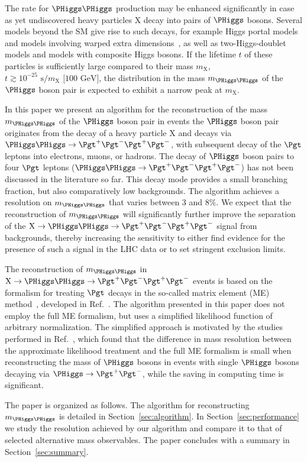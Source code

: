 The rate for $\PHiggs\PHiggs$ production may be enhanced significantly in case as yet undiscovered heavy particles $\textrm{X}$ decay into pairs of $\PHiggs$ bosons.
Several models beyond the SM give rise to such decays, 
for example Higgs portal models~\cite{Englert:2011yb,No:2013wsa} and models involving warped extra dimensions~\cite{Randall:1999ee},
as well as two-Higgs-doublet models and models with composite Higgs bosons.
If the lifetime $t$ of these particles is sufficiently large compared to their mass $m_{\textrm{X}}$, $t \gtrsim 10^{-25}\textrm{~s}/m_{\textrm{X}}\textrm{~[100~GeV]}$, 
the distribution in the mass $m_{\PHiggs\PHiggs}$ of the $\PHiggs$ boson pair is expected to exhibit a narrow peak at $m_{\textrm{X}}$.

In this paper we present an algorithm for the reconstruction of the mass $m_{\PHiggs\PHiggs}$ of the $\PHiggs$ boson pair 
in events the $\PHiggs$ boson pair originates from the decay of a heavy particle $\textrm{X}$ and decays via $\PHiggs\PHiggs \to \Pgt^{+}\Pgt^{-}\Pgt^{+}\Pgt^{-}$,
with subsequent decay of the $\Pgt$ leptons into electrons, muons, or hadrons.
The decay of $\PHiggs$ boson pairs to four $\Pgt$ leptons ($\PHiggs\PHiggs \to \Pgt^{+}\Pgt^{-}\Pgt^{+}\Pgt^{-}$) has not been discussed in the literature so far.
This decay mode provides a small branching fraction, but also comparatively low backgrounds.
The algorithm achieves a resolution on $m_{\PHiggs\PHiggs}$ that varies between $3$ and $8\%$.
We expect that the reconstruction of $m_{\PHiggs\PHiggs}$ will significantly further improve the separation of the $\textrm{X} \to \PHiggs\PHiggs \to \Pgt^{+}\Pgt^{-}\Pgt^{+}\Pgt^{-}$ signal from backgrounds,
thereby increasing the sensitivity to either find evidence for the presence of such a signal in the LHC data or to set stringent exclusion limits.

The reconstruction of $m_{\PHiggs\PHiggs}$ in $\textrm{X} \to \PHiggs\PHiggs \to \Pgt^{+}\Pgt^{-}\Pgt^{+}\Pgt^{-}$ events is
based on the formalism for treating $\Pgt$ decays in the so-called matrix element (ME) method~\cite{Kondo:1988yd,Kondo:1991dw},
developed in Ref.~\cite{SVfitMEM}.
The algorithm presented in this paper does not employ the full ME formalism,
but uses a simplified likelihood function of arbitrary normalization.
The simplified approach is motivated by the studies performed in Ref.~\cite{SVfitMEM}, 
which found that the difference in mass resolution between the approximate likelihood treatment and the full ME formalism 
is small when reconstructing the mass of $\PHiggs$ bosons in events with single $\PHiggs$ bosons decaying via $\PHiggs \to \Pgt^{+}\Pgt^{-}$,
while the saving in computing time is significant.

The paper is organized as follows. 
The algorithm for reconstructing $m_{\PHiggs\PHiggs}$ is detailed in Section~\ref{sec:algorithm}.
In Section~\ref{sec:performance} we study the resolution achieved by our algorithm and compare it to that of selected alternative mass observables.
The paper concludes with a summary in Section~\ref{sec:summary}.
